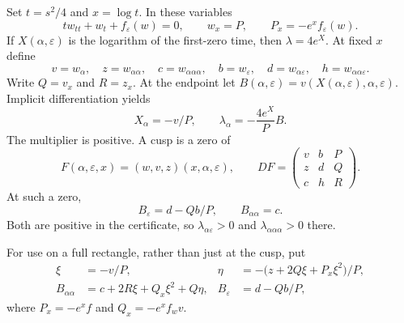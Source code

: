 \documentclass[11pt,a4paper]{report}
\begin{document}
Set $t=s^2/4$ and $x=\log t$. In these variables
\begin{equation}\label{eq:shoot}
 t w_{tt}+w_t+f_\varepsilon(w)=0,
 \qquad w_x=P,\qquad P_x=-e^x f_\varepsilon(w).
\end{equation}
If $X(\alpha,\varepsilon)$ is the logarithm of the first-zero time, then
$\lambda=4e^X$. At fixed $x$ define
\[
 v=w_\alpha,\quad z=w_{\alpha\alpha},\quad c=w_{\alpha\alpha\alpha},
 \quad b=w_\varepsilon,\quad d=w_{\alpha\varepsilon},\quad
 h=w_{\alpha\alpha\varepsilon}.
\]
Write $Q=v_x$ and $R=z_x$. At the endpoint let
$B(\alpha,\varepsilon)=v(X(\alpha,\varepsilon),\alpha,\varepsilon)$.
Implicit differentiation yields
\begin{equation}\label{eq:lambda}
 X_\alpha=-v/P,\qquad
 \lambda_\alpha=-\frac{4e^X}{P}B.
\end{equation}
The multiplier is positive. A cusp is a zero of
\begin{equation}\label{eq:F}
 F(\alpha,\varepsilon,x)=(w,v,z)(x,\alpha,\varepsilon),\qquad
 DF=\begin{pmatrix}v&b&P\\z&d&Q\\c&h&R\end{pmatrix}.
\end{equation}
At such a zero,
\begin{equation}\label{eq:unfold}
 B_\varepsilon=d-Qb/P,\qquad B_{\alpha\alpha}=c.
\end{equation}
Both are positive in the certificate, so
$\lambda_{\alpha\varepsilon}>0$ and $\lambda_{\alpha\alpha\alpha}>0$ there.

For use on a full rectangle, rather than just at the cusp, put
\begin{align}
 \xi&=-v/P,&
 \eta&=-\bigl(z+2Q\xi+P_x\xi^2\bigr)/P,\label{eq:implicit}\\
 B_{\alpha\alpha}&=c+2R\xi+Q_x\xi^2+Q\eta,&
 B_\varepsilon&=d-Qb/P,\nonumber
\end{align}
where $P_x=-e^x f$ and $Q_x=-e^x f_wv$.
\end{document}
